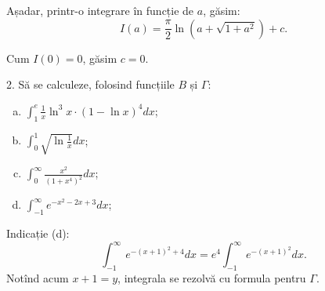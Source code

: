 \documentclass[11pt,a4paper]{article}
\newcommand\ds{\displaystyle}
\theoremstyle{dotless}
\theoremstyle{dotlessdr}
\begin{document}
Așadar, printr-o integrare în funcție de $ a $, găsim:
\[
  I(a) = \frac{\pi}{2} \ln(a + \sqrt{1 + a^2}) + c.
\]

Cum $ I(0) = 0 $, găsim $ c = 0 $.

\vspace{2cm}

2. Să se calculeze, folosind funcțiile $ B $ și $ \Gamma $:
\begin{enumerate}[(a)]
\item $ \ds\int_1^e \frac{1}{x} \ln^3 x \cdot (1 - \ln x)^4 dx $;
\item $ \ds\int_0^1 \sqrt{\ln \frac{1}{x}} dx $;
\item $ \ds\int_0^\infty \frac{x^2}{(1 + x^4)^2} dx $;
\item $ \ds\int_{-1}^\infty e^{-x^2 - 2x + 3} dx $;
\end{enumerate}

Indicație (d):
\[
  \int_{-1}^\infty e^{-(x + 1)^2 + 4} dx = e^4 \int_{-1}^\infty e^{-(x + 1)^2 } dx.
\]
Notînd acum $ x + 1 = y $, integrala se rezolvă cu formula pentru $ \Gamma $.
\end{document}
